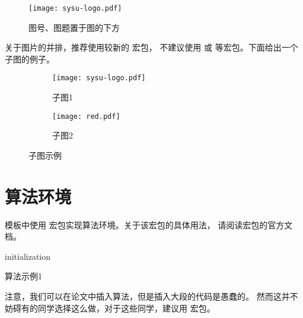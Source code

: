 \begin{figure}[h]
  \centering
  \texttt{[image: sysu-logo.pdf]}
  \caption{图号、图题置于图的下方}
  \label{fig:confusion}
\end{figure}

关于图片的并排，推荐使用较新的  宏包，
不建议使用  或  等宏包。下面给出一个子图的例子。

\begin{figure}[h]
  \centering
  \begin{subfigure}[h]{0.49\textwidth}
      \centering
      \texttt{[image: sysu-logo.pdf]}
      \caption{子图1}
  \end{subfigure}
  \begin{subfigure}[h]{0.49\textwidth}
      \centering
      \texttt{[image: red.pdf]}
      \caption{子图2}
  \end{subfigure}
  \caption{子图示例}
\end{figure}



\section{算法环境}

模板中使用  宏包实现算法环境。关于该宏包的具体用法，
请阅读宏包的官方文档。

\begin{algorithm}
  \SetAlgoLined

  initialization\;
  \caption{算法示例1}
  \label{algo:algorithm1}
\end{algorithm}

注意，我们可以在论文中插入算法，但是插入大段的代码是愚蠢的。
然而这并不妨碍有的同学选择这么做，对于这些同学，建议用  宏包。
